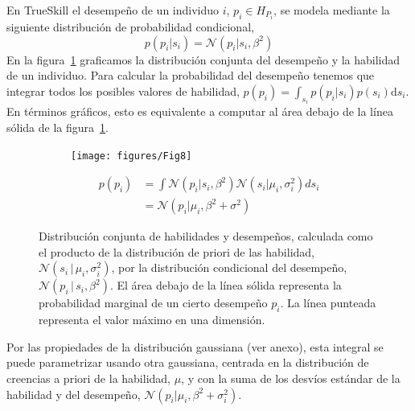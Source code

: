 \documentclass[a4paper,11pt]{book}
\newcommand{\N}{\mathcal{N}}
\theoremstyle{definition}
\begin{document}
En TrueSkill el desempe\~no de un individuo $i$, $p_i \in H_{P_i}$, se modela mediante la siguiente distribuci\'on de probabilidad condicional,
%
\begin{equation}
p(p_i|s_i) = \N(p_i | s_i, \beta^2)
\end{equation}
%
En la figura~\ref{paso_1_multiplicacion_normales} graficamos la distribuci\'on conjunta del desempe\~no y la habilidad de un individuo.
%
Para calcular la probabilidad del desempe\~no tenemos que integrar todos los posibles valores de habilidad, $p(p_i) = \int_{s_i} p(p_i|s_i)p(s_i) \text{d}s_i $.
%
En t\'erminos gr\'aficos, esto es equivalente a computar al \'area debajo de la l\'inea s\'olida de la figura~\ref{paso_1_multiplicacion_normales}.
%
\begin{figure}[ht!]
\centering
\begin{subfigure}[c]{0.4\textwidth}
\centering
\texttt{[image: figures/Fig8]}
\end{subfigure}
\begin{subfigure}[c]{0.5\textwidth}
\begin{align*}\label{p.p_i}
p(p_i) & = \int \N(p_i | s_i, \beta^2) \N(s_i | \mu_i,\sigma_i^2) ds_i  \\
&= \N(p_i|\mu_i, \beta^2 + \sigma^2)
\end{align*}
\end{subfigure}
\caption{Distribuci\'on conjunta de habilidades y desempe\~nos, calculada como el producto de la distribuci\'on de priori de las habilidad, $\N(s_i \, | \, \mu_i, \sigma_i^2)$, por la distribuci\'on condicional del desempe\~no, $\N(p_i \, | \, s_i, \beta^2)$.
%
El \'area debajo de la l\'inea s\'olida representa la probabilidad marginal de un cierto desempe\~no $p_i$.
%
La l\'inea punteada representa el valor m\'aximo en una dimensi\'on.
}
\label{paso_1_multiplicacion_normales}
\end{figure}
%
Por las propiedades de la distribuci\'on gaussiana (ver anexo), esta integral se puede parametrizar usando otra gaussiana, centrada en la distribuci\'on de creencias a priori de la habilidad, $\mu$, y con la suma de los desv\'ios est\'andar de la habilidad y del desempe\~no, $\N(p_i | \mu_i, \beta^2 +\sigma_i^2)$.

\end{document}
